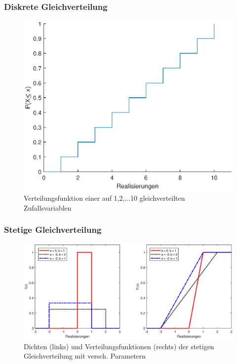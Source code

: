 \begin{frame}
\frametitle{Diskrete Gleichverteilung}
\begin{figure}[hbtp]
\centering
\includegraphics[scale = 0.5]{images/plot_discrete_uniform.eps}
\caption{Verteilungsfunktion einer auf {1,2,...10} gleichverteilten Zufallsvariablen}
\end{figure}
\end{frame}
\begin{frame}
\frametitle{Stetige Gleichverteilung}
\begin{figure}[hbtp]
\centering
\includegraphics[scale=0.5]{images/plot_con_uniform.eps}
\caption{Dichten (links) und Verteilungsfunktionen (rechts) der stetigen Gleichverteilung mit versch. Parametern}
\end{figure}
\end{frame}
